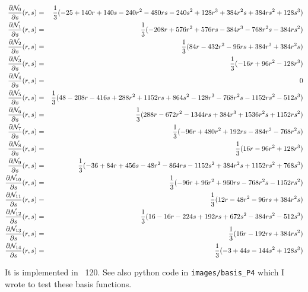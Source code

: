 \begin{eqnarray}
\frac{\partial{\mathcal{N}}_0}{\partial s} (r,s) &=& \frac13 ( -25+140r+140s 
-240r^2-480rs-240s^2+128 r^3 + 384 r^2s + 384 rs^2 + 128 s^3 ) \nonumber\\
\frac{\partial{\mathcal{N}}_1}{\partial s} (r,s) &=& \frac13 ( -208r +576r^2+576rs-384r^3-768r^2s-384rs^2)\nonumber\\
\frac{\partial{\mathcal{N}}_2}{\partial s} (r,s) &=& \frac13(84r-432r^2-96rs+384r^3+384r^2s)\nonumber\\
\frac{\partial{\mathcal{N}}_3}{\partial s} (r,s) &=& \frac13(-16r+96r^2-128r^3)\nonumber\\
\frac{\partial{\mathcal{N}}_4}{\partial s} (r,s) &=& 0\nonumber\\
\frac{\partial{\mathcal{N}}_5}{\partial s} (r,s) &=& \frac13(48-208r-416s+288r^2+1152rs+864s^2-128r^3-768r^2s-1152rs^2-512s^3)\nonumber\\
\frac{\partial{\mathcal{N}}_6}{\partial s} (r,s) &=& \frac13(288r-672r^2-1344rs+384r^3+1536r^2s+1152rs^2)\nonumber\\
\frac{\partial{\mathcal{N}}_7}{\partial s} (r,s) &=& \frac13(-96r+480r^2+192rs-384r^3-768r^2s)\nonumber\\
\frac{\partial{\mathcal{N}}_8}{\partial s} (r,s) &=& \frac13(16r-96r^2+128r^3)\nonumber\\
\frac{\partial{\mathcal{N}}_9}{\partial s} (r,s) &=& \frac13(-36+84r+456s-48r^2-864rs-1152s^2+384r^2s+1152rs^2+768s^3)\nonumber\\
\frac{\partial{\mathcal{N}}_{10}}{\partial s} (r,s) &=& \frac13(-96r+96r^2+960rs-768r^2s-1152rs^2)\nonumber\\
\frac{\partial{\mathcal{N}}_{11}}{\partial s} (r,s) &=& \frac13(12r-48r^2-96rs+384r^2s)\nonumber\\
\frac{\partial{\mathcal{N}}_{12}}{\partial s} (r,s) &=& \frac13(16-16r-224s+192rs+672s^2-384rs^2-512s^3)\nonumber\\
\frac{\partial{\mathcal{N}}_{13}}{\partial s} (r,s) &=& \frac13(16r-192rs+384rs^2)\nonumber\\
\frac{\partial{\mathcal{N}}_{14}}{\partial s} (r,s) &=& \frac13(-3+44s-144s^2+128s^3)\nonumber
\end{eqnarray}







It is implemented in \stone~120.
See also python code in {\tt images/basis\_P4} which I wrote to test these basis functions.
